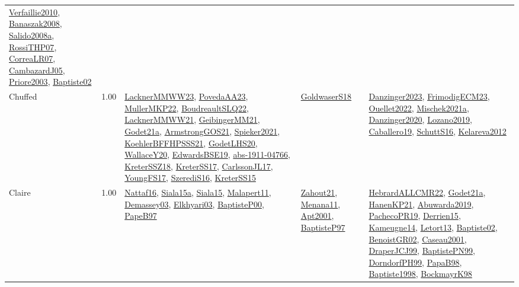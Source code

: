 {\begin{longtable}{p{3cm}r>{\raggedright\arraybackslash}p{6cm}>{\raggedright\arraybackslash}p{6cm}>{\raggedright\arraybackslash}p{8cm}}
\hyperref[detail:Verfaillie2010]{Verfaillie2010}, \hyperref[detail:Banaszak2008]{Banaszak2008}, \hyperref[detail:Salido2008a]{Salido2008a}, \hyperref[detail:RossiTHP07]{RossiTHP07}, \hyperref[detail:CorreaLR07]{CorreaLR07}, \hyperref[detail:CambazardJ05]{CambazardJ05}, \hyperref[detail:Priore2003]{Priore2003}, \hyperref[detail:Baptiste02]{Baptiste02}\\
\index{Chuffed}\index{CPSystems!Chuffed}Chuffed &  1.00 & \hyperref[detail:LacknerMMWW23]{LacknerMMWW23}, \hyperref[detail:PovedaAA23]{PovedaAA23}, \hyperref[detail:MullerMKP22]{MullerMKP22}, \hyperref[detail:BoudreaultSLQ22]{BoudreaultSLQ22}, \hyperref[detail:LacknerMMWW21]{LacknerMMWW21}, \hyperref[detail:GeibingerMM21]{GeibingerMM21}, \hyperref[detail:Godet21a]{Godet21a}, \hyperref[detail:ArmstrongGOS21]{ArmstrongGOS21}, \hyperref[detail:Spieker2021]{Spieker2021}, \hyperref[detail:KoehlerBFFHPSSS21]{KoehlerBFFHPSSS21}, \hyperref[detail:GodetLHS20]{GodetLHS20}, \hyperref[detail:WallaceY20]{WallaceY20}, \hyperref[detail:EdwardsBSE19]{EdwardsBSE19}, \hyperref[detail:abs-1911-04766]{abs-1911-04766}, \hyperref[detail:KreterSSZ18]{KreterSSZ18}, \hyperref[detail:KreterSS17]{KreterSS17}, \hyperref[detail:CarlssonJL17]{CarlssonJL17}, \hyperref[detail:YoungFS17]{YoungFS17}, \hyperref[detail:SzerediS16]{SzerediS16}, \hyperref[detail:KreterSS15]{KreterSS15} & \hyperref[detail:GoldwaserS18]{GoldwaserS18} & \hyperref[detail:Danzinger2023]{Danzinger2023}, \hyperref[detail:FrimodigECM23]{FrimodigECM23}, \hyperref[detail:Ouellet2022]{Ouellet2022}, \hyperref[detail:Mischek2021a]{Mischek2021a}, \hyperref[detail:Danzinger2020]{Danzinger2020}, \hyperref[detail:Lozano2019]{Lozano2019}, \hyperref[detail:Caballero19]{Caballero19}, \hyperref[detail:SchuttS16]{SchuttS16}, \hyperref[detail:Kelareva2012]{Kelareva2012}\\
\index{Claire}\index{CPSystems!Claire}Claire &  1.00 & \hyperref[detail:Nattaf16]{Nattaf16}, \hyperref[detail:Siala15a]{Siala15a}, \hyperref[detail:Siala15]{Siala15}, \hyperref[detail:Malapert11]{Malapert11}, \hyperref[detail:Demassey03]{Demassey03}, \hyperref[detail:Elkhyari03]{Elkhyari03}, \hyperref[detail:BaptisteP00]{BaptisteP00}, \hyperref[detail:PapeB97]{PapeB97} & \hyperref[detail:Zahout21]{Zahout21}, \hyperref[detail:Menana11]{Menana11}, \hyperref[detail:Apt2001]{Apt2001}, \hyperref[detail:BaptisteP97]{BaptisteP97} & \hyperref[detail:HebrardALLCMR22]{HebrardALLCMR22}, \hyperref[detail:Godet21a]{Godet21a}, \hyperref[detail:HanenKP21]{HanenKP21}, \hyperref[detail:Abuwarda2019]{Abuwarda2019}, \hyperref[detail:PachecoPR19]{PachecoPR19}, \hyperref[detail:Derrien15]{Derrien15}, \hyperref[detail:Kameugne14]{Kameugne14}, \hyperref[detail:Letort13]{Letort13}, \hyperref[detail:Baptiste02]{Baptiste02}, \hyperref[detail:BenoistGR02]{BenoistGR02}, \hyperref[detail:Caseau2001]{Caseau2001}, \hyperref[detail:DraperJCJ99]{DraperJCJ99}, \hyperref[detail:BaptistePN99]{BaptistePN99}, \hyperref[detail:DorndorfPH99]{DorndorfPH99}, \hyperref[detail:PapaB98]{PapaB98}, \hyperref[detail:Baptiste1998]{Baptiste1998}, \hyperref[detail:BockmayrK98]{BockmayrK98}\\

\end{longtable}}
